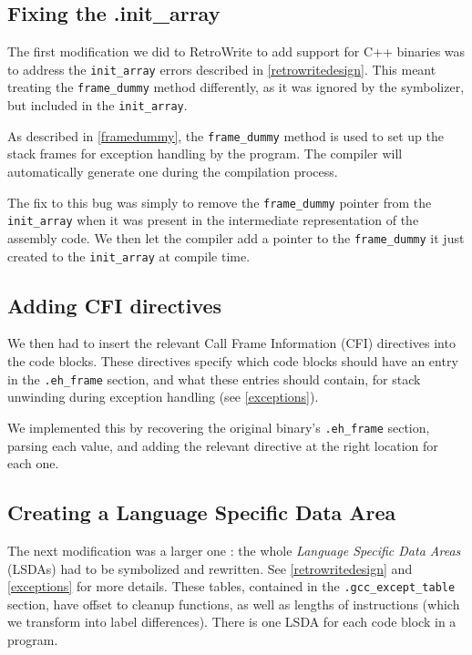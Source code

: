 \documentclass[a4paper,11pt,oneside]{report}
\begin{document}
\subsection{Fixing the .init\_array}
\label{fixinginitarray}

The first modification we did to RetroWrite to add support for C++ binaries
was to address the \texttt{init\_array} errors described in
\autoref{retrowritedesign}.
This meant treating the \texttt{frame\_dummy} method differently, as it was
ignored by the symbolizer, but included in the \texttt{init\_array}.

As described in \autoref{framedummy}, the \texttt{frame\_dummy} method is used
to set up the stack frames for exception handling by the program.
The compiler will automatically generate one during the compilation process.

The fix to this bug was simply to remove the \texttt{frame\_dummy} pointer
from the \texttt{init\_array} when it was present in the intermediate
representation of the assembly code.
We then let the compiler add a pointer to the \texttt{frame\_dummy} it just
created to the \texttt{init\_array} at compile time.

\subsection{Adding CFI directives}
\label{addingcfi}

We then had to insert the relevant Call Frame Information (CFI) directives
into the code blocks. These directives specify which code blocks should have
an entry in the \texttt{.eh\_frame} section, and what these entries should
contain, for stack unwinding during exception handling (see
\autoref{exceptions}).

We implemented this by recovering the original binary's \texttt{.eh\_frame}
section, parsing each value, and adding the relevant directive at the right
location for each one.

\subsection{Creating a Language Specific Data Area}
\label{creatinglsda}

The next modification was a larger one : the whole \emph{Language Specific
Data Areas} (LSDAs) had to be symbolized and rewritten.
See \autoref{retrowritedesign} and \autoref{exceptions} for more details.
These tables, contained in the \texttt{.gcc\_except\_table} section, have
offset to cleanup functions, as well as lengths of instructions (which we
transform into label differences).
There is one LSDA for each code block in a program.
\end{document}
